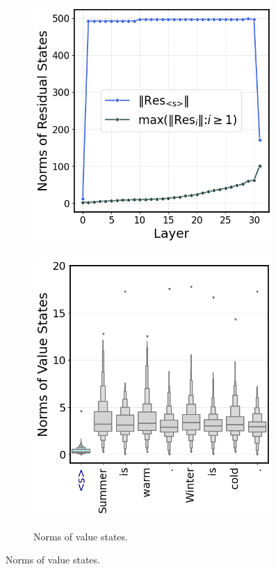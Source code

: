 \begin{figure}[t]
\begin{subfigure}[t]{0.3\textwidth}
      \includegraphics[width=\textwidth]{Figures/residual_norms.png}
      \label{fig:token_norms_massive}
  \end{subfigure}
  \hfill
  \begin{subfigure}[t]{0.3\textwidth}
      \centering 
      \caption{\small Norms of value states.}
      \includegraphics[width=\textwidth]{Figures/value_state_norms.png}
      \label{fig:value_norms_zeroed}
  \end{subfigure}
  

\end{figure}
